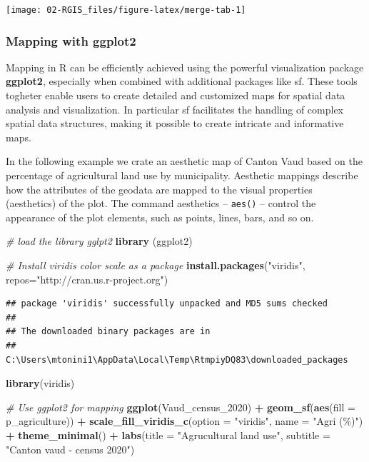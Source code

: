 \documentclass[
]{article}
\newenvironment{Shaded}{\begin{snugshade}}{\end{snugshade}}
\newcommand{\AttributeTok}[1]{\textcolor[rgb]{0.13,0.29,0.53}{#1}}
\newcommand{\CommentTok}[1]{\textcolor[rgb]{0.56,0.35,0.01}{\textit{#1}}}
\newcommand{\FunctionTok}[1]{\textcolor[rgb]{0.13,0.29,0.53}{\textbf{#1}}}
\newcommand{\NormalTok}[1]{#1}
\newcommand{\SpecialCharTok}[1]{\textcolor[rgb]{0.81,0.36,0.00}{\textbf{#1}}}
\newcommand{\StringTok}[1]{\textcolor[rgb]{0.31,0.60,0.02}{#1}}
\begin{document}
\begin{center}\texttt{[image: 02-RGIS\_files/figure-latex/merge-tab-1]} \end{center}

\subsubsection{Mapping with ggplot2}\label{mapping-with-ggplot2}

Mapping in R can be efficiently achieved using the powerful visualization package \textbf{ggplot2}, especially when combined with additional packages like sf. These tools togheter enable users to create detailed and customized maps for spatial data analysis and visualization. In particular sf facilitates the handling of complex spatial data structures, making it possible to create intricate and informative maps.

In the following example we crate an aesthetic map of Canton Vaud based on the percentage of agricultural land use by municipality. Aesthetic mappings describe how the attributes of the geodata are mapped to the visual properties (aesthetics) of the plot. The command aesthetics -- \texttt{aes()} -- control the appearance of the plot elements, such as points, lines, bars, and so on.

\begin{Shaded}
\begin{Highlighting}[]
\CommentTok{\# load the library gglpt2}
\FunctionTok{library}\NormalTok{ (ggplot2)}

\CommentTok{\# Install viridis color scale as a package }
\FunctionTok{install.packages}\NormalTok{(}\StringTok{"viridis"}\NormalTok{, }\AttributeTok{repos=}\StringTok{"http://cran.us.r{-}project.org"}\NormalTok{)}
\end{Highlighting}
\end{Shaded}

\begin{verbatim}
## package 'viridis' successfully unpacked and MD5 sums checked
## 
## The downloaded binary packages are in
##  C:\Users\mtonini1\AppData\Local\Temp\RtmpiyDQ83\downloaded_packages
\end{verbatim}

\begin{Shaded}
\begin{Highlighting}[]
\FunctionTok{library}\NormalTok{(viridis)}

\CommentTok{\# Use ggplot2 for mapping}
\FunctionTok{ggplot}\NormalTok{(Vaud\_census\_2020) }\SpecialCharTok{+}
  \FunctionTok{geom\_sf}\NormalTok{(}\FunctionTok{aes}\NormalTok{(}\AttributeTok{fill =}\NormalTok{ p\_agriculture)) }\SpecialCharTok{+}
  \FunctionTok{scale\_fill\_viridis\_c}\NormalTok{(}\AttributeTok{option =} \StringTok{"viridis"}\NormalTok{, }\AttributeTok{name =} \StringTok{"Agri (\%)"}\NormalTok{) }\SpecialCharTok{+}
  \FunctionTok{theme\_minimal}\NormalTok{() }\SpecialCharTok{+}
  \FunctionTok{labs}\NormalTok{(}\AttributeTok{title =} \StringTok{"Agrucultural land use"}\NormalTok{,}
       \AttributeTok{subtitle =} \StringTok{"Canton vaud {-} census 2020"}\NormalTok{)}
\end{Highlighting}
\end{Shaded}
\end{document}
